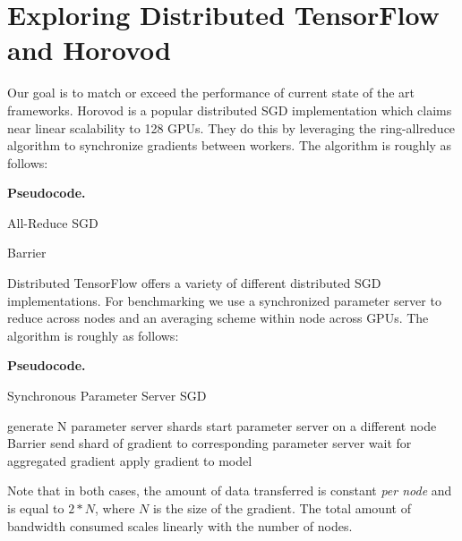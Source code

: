 \documentclass{article}
\begin{document}
\section{Exploring Distributed TensorFlow and Horovod}

Our goal is to match or exceed the performance of current state of the art frameworks. Horovod is a popular distributed SGD implementation which claims near linear scalability to 128 GPUs. They do this by leveraging the ring-allreduce algorithm to synchronize gradients between workers. The algorithm is roughly as follows:

\textbf{Pseudocode.}
\begin{algorithm}
\caption{All-Reduce SGD}
 {
}
Barrier\;

 {
}


 {
}
\end{algorithm}

Distributed TensorFlow offers a variety of different distributed SGD implementations. For benchmarking we use a synchronized parameter server to reduce across nodes and an averaging scheme within node across GPUs. The algorithm is roughly as follows:

\textbf{Pseudocode.}
\begin{algorithm}
\caption{Synchronous Parameter Server SGD}
 {
}
generate N parameter server shards\;
 {
    start parameter server on a different node \;
}
Barrier\;
 {
send shard of gradient to corresponding parameter server \;
wait for aggregated gradient \;
apply gradient to model \;
}
\end{algorithm}

Note that in both cases, the amount of data transferred is constant \textit{per node} and is equal to $2 * N$, where $N$ is the size of the gradient. The total amount of bandwidth consumed scales linearly with the number of nodes.
\end{document}
